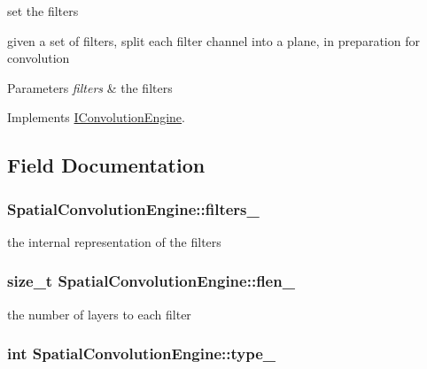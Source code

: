 set the filters 

given a set of filters, split each filter channel into a plane, in preparation for convolution


\begin{DoxyParams}{Parameters}
{\em filters} & the filters \\
\hline
\end{DoxyParams}


Implements \hyperlink{class_i_convolution_engine_a3570aae351b5fcb93bcd87a06c65ea0a}{I\-Convolution\-Engine}.



\subsection{Field Documentation}
\hypertarget{class_spatial_convolution_engine_aec615ebfbedc8b7812481be1c2bcb1e5}{
\subsubsection[{filters\-\_\-}]{ Spatial\-Convolution\-Engine\-::filters\-\_\-\hspace{0.3cm}{\ttfamily [private]}}}\label{class_spatial_convolution_engine_aec615ebfbedc8b7812481be1c2bcb1e5}


the internal representation of the filters 

\hypertarget{class_spatial_convolution_engine_a5d58b30ec6846ef7ccf98f980d4fc957}{
\subsubsection[{flen\-\_\-}]{\setlength{\rightskip}{0pt plus 5cm}size\-\_\-t Spatial\-Convolution\-Engine\-::flen\-\_\-\hspace{0.3cm}{\ttfamily [private]}}}\label{class_spatial_convolution_engine_a5d58b30ec6846ef7ccf98f980d4fc957}


the number of layers to each filter 

\hypertarget{class_spatial_convolution_engine_a913adab567840b6d1b2407c3b22ca108}{
\subsubsection[{type\-\_\-}]{\setlength{\rightskip}{0pt plus 5cm}int Spatial\-Convolution\-Engine\-::type\-\_\-\hspace{0.3cm}{\ttfamily [private]}}}\label{class_spatial_convolution_engine_a913adab567840b6d1b2407c3b22ca108}


